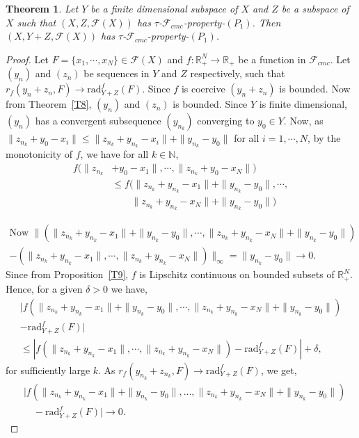 \documentclass[11pt]{amsart}
\newtheorem{thm}{Theorem}[section]
\newcommand{\ra}{\rightarrow}
\newcommand{\de}{\delta}
\newcommand{\mb}{\mathbb}
\newcommand{\mc}{\mathcal}
\newcommand{\mr}{\mathscr}
\newcommand{\iy}{\infty}
\newcommand{\trr}{\textrm{rad}}
\newcommand{\beqa}{\begin{eqnarray*}}
\newcommand{\eeqa}{\end{eqnarray*}}
\begin{document}
\begin{thm}\label{T2}
Let $Y$ be a finite dimensional subspace of $X$ and $Z$ be a subspace of $X$ such that $(X,Z,\mc{F}(X))$ has $\tau$-$\mr{F}_{cmc}$-property-$(P_1)$. Then $(X,Y+Z,\mc{F}(X))$ has $\tau$-$\mr{F}_{cmc}$-property-$(P_1)$.
\end{thm}
\begin{proof}
Let $F=\{x_1,\cdots,x_N\}\in\mc{F}(X)$ and $f:\mb{R}^N_+\ra\mb{R}_+$ be a function in $\mr{F}_{cmc}$. Let $(y_n)$ and $(z_n)$ be sequences in $Y$ and $Z$ respectively, such that $r_f(y_n+z_n,F)\ra\trr_{Y+Z}^f(F)$. Since $f$ is coercive $(y_n+z_n)$ is bounded. Now from Theorem~\ref{T8}, $(y_n)$ and $(z_n)$ is bounded.  Since $Y$ is finite dimensional, $(y_n)$ has a convergent subsequence $(y_{n_k})$ converging to $y_0\in Y$. Now, as $\|z_{n_k}+y_0-x_i\|\leq\|z_{n_k}+y_{n_k}-x_i\|+\|y_{n_k}-y_0\|$ for all $i=1,\cdots,N$, by the monotonicity of $f$, we have  for all $k\in\mb{N}$,
\begin{align}\label{e1}
f(\|z_{n_k}&+y_0-x_1\|,\cdots,\|z_{n_k}+y_0-x_N\|) \nonumber \\
&\leq f(\|z_{n_k}+y_{n_k}-x_1\|+\|y_{n_k}-y_0\|,\cdots,\nonumber \\
&\qquad \|z_{n_k}+y_{n_k}-x_N\|+\|y_{n_k}-y_0\|)
\end{align}

\beqa
\mbox{Now~}\|(\|z_{n_k}+y_{n_k}-x_1\|+\|y_{n_k}-y_0\|,\cdots,\|z_{n_k}+y_{n_k}-x_N\|+\|y_{n_k}-y_0\|)\\-(\|z_{n_k}+y_{n_k}-x_1\|,\cdots,
\|z_{n_k}+y_{n_k}-x_N\|)\|_\iy=\|y_{n_k}-y_0\|\ra0.
\eeqa 
Since from Proposition~\ref{T9}, $f$ is Lipschitz continuous on bounded subsets of $\mb{R}_+^N$. Hence, for a given $\de>0$ we have,
\begin{align*}
|f(\|z_{n_k}+y_{n_k}-x_1\|+\|y_{n_k}-y_0\|,\cdots,\|z_{n_k}+y_{n_k}-x_N\|+\|y_{n_k}-y_0\|)\\-\trr_{Y+Z}^f(F)|\\
\leq|f(\|z_{n_k}+y_{n_k}-x_1\|,\cdots,\|z_{n_k}+y_{n_k}-x_N\|)-\trr_{Y+Z}^f(F)|+\de,
\end{align*}
for sufficiently large $k$. As $r_f(y_{n_k}+z_{n_k},F)\ra \trr_{Y+Z}^f(F)$, we get,
\begin{equation*}
    \begin{aligned}
      &|f(\|z_{n_k} + y_{n_k} - x_1\| + \|y_{n_k} - y_0\|, \dots, \|z_{n_k} + y_{n_k} - x_N\| + \|y_{n_k} - y_0\|) \\
      &\quad - \trr_{Y+Z}^f(F)| \ra 0.
    \end{aligned}
  \end{equation*}


\end{proof}
\end{document}
